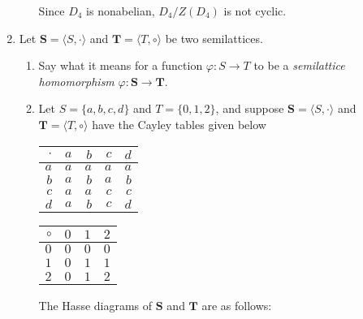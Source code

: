 \documentclass[fleqn,12pt]{article}
\newcommand{\<}{\ensuremath{\langle}}
\renewcommand{\>}{\ensuremath{\rangle}}
\newcommand{\bS}{\ensuremath{\mathbf{S}}}
\newcommand{\bT}{\ensuremath{\mathbf{T}}}
\begin{document}
\begin{enumerate}[{\bf 1.}]
\begin{enumerate}
\medskip

Since $D_4$ is nonabelian, $D_4/Z(D_4)$ is not cyclic.
\end{enumerate}
\newpage

\item Let $\bS = \<S, \cdot\>$ and $\bT = \<T, \circ\>$ be two semilattices.
  \begin{enumerate}
  \item Say what it means for a function $\varphi: S \rightarrow T$ to be a
    \emph{semilattice homomorphism} $\varphi: \bS \rightarrow \bT$.
\vskip3cm
\item Let $S = \{a, b, c, d\}$ and $T = \{0, 1, 2\}$, and suppose 
  $\bS = \<S, \cdot\>$ and
  $\bT= \<T, \circ\>$ have the Cayley tables given below

\medskip
\begin{center}
\begin{tabular}{r|rrrr}
  $\cdot$ & $a$ &$b$&$c$&$d $\\
\hline
  $a$ & $a$ &$a$&$a$&$a$\\
  $b$ & $a$ &$b$&$a$&$b$\\
  $c$ & $a$ &$a$&$c$&$c$\\
  $d$ & $a$ &$b$&$c$&$d$
\end{tabular}
\hskip2cm
\begin{tabular}{r|rrr}
  $\circ$ & $0$ &$1$&$2$\\
\hline
  $0$ & $0$ &$0$&$0$\\
  $1$ & $0$ &$1$&$1$\\
  $2$ & $0$ &$1$&$2$
\end{tabular}
\end{center}

\medskip
The Hasse diagrams of $\bS$ and $\bT$ are as follows:
\begin{center}
  
\end{center}


\end{enumerate}
\end{enumerate}
\end{document}
